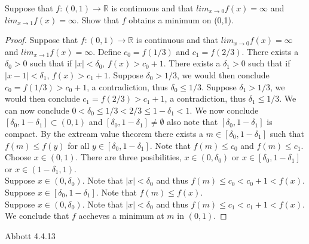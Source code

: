 \documentclass[12pt]{article}
\makeatletter
\theoremstyle{homework}
\newenvironment{exercise}[1]
{\def\@currentlabel{#1}\exercisecore}
{\endexercisecore}
\makeatother
\begin{document}
\begin{exercise} 5
Suppose that $f : (0,1) \rightarrow\mathbb{R}$ is continuous and that $lim_{x\rightarrow 0} f (x) = \infty$ and $lim_{x\rightarrow 1} f (x) = \infty$. Show that $f$ obtains a minimum on (0,1).
\end{exercise}
\begin{proof}
Suppose that $f : (0,1) \rightarrow\mathbb{R}$ is continuous and that $lim_{x\rightarrow 0} f (x) = \infty$ and $lim_{x\rightarrow 1} f (x) = \infty$.  Define $c_0=f(1/3)$ and $c_1=f(2/3)$.  There exists a $\delta_0>0$ such that if $|x|<\delta_0$, $f(x)>c_0+1$.  There exists a $\delta_1>0$ such that if $|x-1|<\delta_1$, $f(x)>c_1+1$.  Suppose $\delta_0> 1/3$, we would then conclude $c_0=f(1/3)>c_0+1$, a contradiction, thus $\delta_0\leq 1/3$.  Suppose $\delta_1> 1/3$, we would then conclude $c_1=f(2/3)>c_1+1$, a contradiction, thus $\delta_1\leq 1/3$.  We can now conclude $0<\delta_0\leq 1/3<2/3\leq 1-\delta_1<1$.  We now conclude $[\delta_0,1-\delta_1]\subset (0,1)$ and $[\delta_0,1-\delta_1]\neq \emptyset$ also note that $[\delta_0,1-\delta_1]$ is compact.  By the extream value theorem there exists a $m\in [\delta_0,1-\delta_1]$ such that $f(m)\leq f(y)$ for all $y\in [\delta_0,1-\delta_1]$.  Note that $f(m)\leq c_0$ and $f(m)\leq c_1$.\\
Choose $x\in (0,1)$.  There are three posibilities, $x\in(0,\delta_0)$ or $x\in [\delta_0,1-\delta_1]$ or $x\in(1-\delta_1,1)$.\\
Suppose $x\in(0,\delta_0)$.  Note that $|x|<\delta_0$ and thus $f(m)\leq c_0<c_0+1<f(x)$.\\
Suppose $x\in[\delta_0,1-\delta_1]$.  Note that $f(m)\leq f(x)$.\\
Suppose $x\in(0,\delta_0)$.  Note that $|x|<\delta_0$ and thus $f(m)\leq c_1<c_1+1<f(x)$.\\
We conclude that $f$ accheves a minimum at $m$ in $(0,1)$.
\end{proof}
\begin{exercise} 6
Abbott 4.4.13
\end{exercise}
\end{document}
